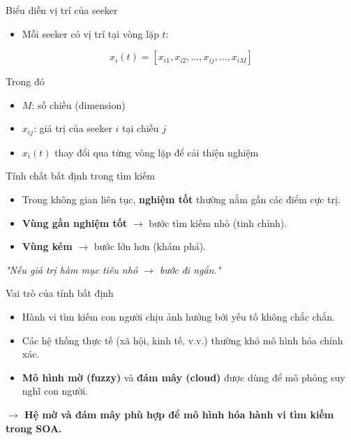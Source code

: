 \documentclass[10pt]{beamer}
\begin{document}
\begin{frame}{Biểu diễn vị trí của seeker}
\begin{itemize}
    \item Mỗi seeker có vị trí tại vòng lặp $t$:
\end{itemize}

\vspace{-1em}
\begin{equation*}
x_i(t) = [x_{i1}, x_{i2}, \ldots, x_{ij}, \ldots, x_{iM}]
\end{equation*}

\vspace{0.5em}
Trong đó
\begin{itemize}
    \item $M$: số chiều (dimension)
    \item $x_{ij}$: giá trị của seeker $i$ tại chiều $j$
    \item $x_i(t)$ thay đổi qua từng vòng lặp để cải thiện nghiệm
\end{itemize}
\end{frame}

\begin{frame}{Tính chất bất định trong tìm kiếm}
\begin{itemize}
    \item Trong không gian liên tục, \textbf{nghiệm tốt} thường nằm gần các điểm cực trị.
    \item \textbf{Vùng gần nghiệm tốt} $\to$ bước tìm kiếm nhỏ (tinh chỉnh).
    \item \textbf{Vùng kém} $\to$ bước lớn hơn (khám phá).
\end{itemize}

\vspace{1em}
\centering
\textit{"Nếu giá trị hàm mục tiêu nhỏ $\to$ bước đi ngắn."}
\end{frame}

\begin{frame}{Vai trò của tính bất định}
\begin{itemize}
    \item Hành vi tìm kiếm con người chịu ảnh hưởng bởi yếu tố không chắc chắn.
    \item Các hệ thống thực tế (xã hội, kinh tế, v.v.) thường khó mô hình hóa chính xác.
    \item \textbf{Mô hình mờ (fuzzy)} và \textbf{đám mây (cloud)} được dùng để mô phỏng suy nghĩ con người.
\end{itemize}

\vspace{0.5em}
\textbf{$\to$ Hệ mờ và đám mây phù hợp để mô hình hóa hành vi tìm kiếm trong SOA.}
\end{frame}
\end{document}
